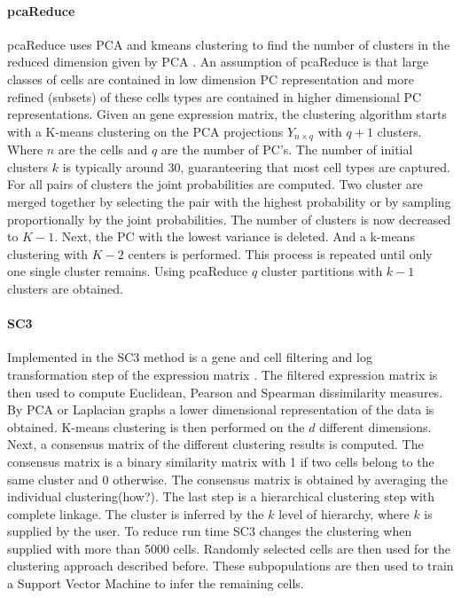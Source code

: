 \documentclass[11pt, a4paper]{article}\usepackage[]{graphicx}\usepackage[]{color}
\begin{document}
\paragraph{pcaReduce}
pcaReduce uses PCA and kmeans clustering to find the number of clusters in the reduced dimension given by PCA \citep{yau2016pcareduce}. An assumption of pcaReduce is  that large classes of cells are contained in low dimension PC representation and more refined (subsets) of these cells types are contained in higher dimensional PC representations. Given an gene expression matrix, the clustering algorithm starts with a K-means clustering on the PCA projections $Y_{n\times q}$ with $q+1$ clusters. Where $n$ are the cells and $q$ are the number of PC's. The number of initial clusters $k$ is typically around 30,  guaranteering that most cell types are captured. For all pairs of clusters the joint probabilities are computed.  Two cluster are merged together by selecting the pair with the highest probability or by sampling proportionally by the joint probabilities. The number of clusters is now decreased to $K-1$. Next, the PC with the lowest variance is deleted. And a k-means clustering with $K-2$ centers is performed. This process is repeated until only one single cluster remains. Using pcaReduce $q$ cluster partitions with $k-1$ clusters are obtained.

\paragraph{SC3}
Implemented in the SC3 method is a gene and cell filtering and log transformation step of the expression matrix \citep{kiselev2017sc3}. The filtered expression matrix is then used to compute  Euclidean, Pearson and  Spearman dissimilarity measures. By PCA or Laplacian graphs  a lower dimensional representation of the data is obtained.  K-means clustering is then performed on the $d$ different dimensions. Next, a consensus matrix of the different clustering results is computed. The consensus matrix is a binary similarity matrix with 1 if two cells belong to the same cluster and 0 otherwise. The consensus matrix is obtained by averaging the individual clustering(how?). The last step is a hierarchical clustering step with complete linkage. The cluster is inferred by the $k$ level of hierarchy, where $k$ is supplied by the user. To reduce run time SC3 changes the clustering when supplied with more than 5000 cells. Randomly selected cells are then used for the clustering approach described before. These subpopulations are then used to train a Support Vector Machine to infer the remaining cells.
\end{document}
